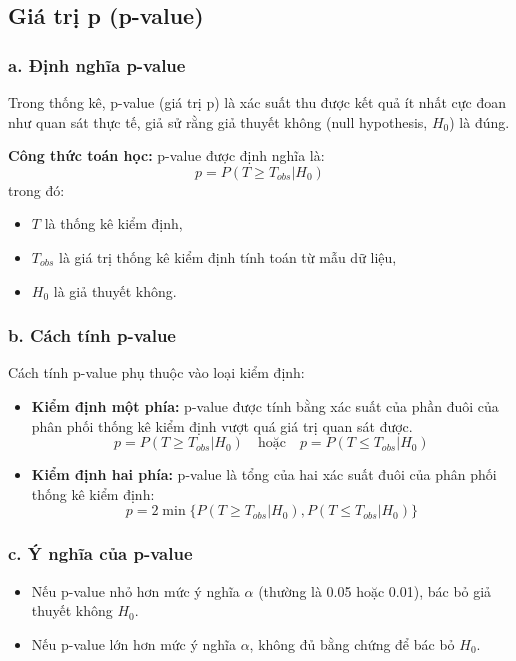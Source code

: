 \subsection{Giá trị p (p-value)}
\subsubsection{a. Định nghĩa p-value}
Trong thống kê, p-value (giá trị p) là xác suất thu được kết quả ít nhất cực đoan như quan sát thực tế, giả sử rằng giả thuyết không (null hypothesis, $H_0$) là đúng.

\textbf{Công thức toán học: }p-value được định nghĩa là:
\begin{equation}
    p = P(T \geq T_{obs} | H_0)
\end{equation}
trong đó:
\begin{itemize}
    \item $T$ là thống kê kiểm định,
    \item $T_{obs}$ là giá trị thống kê kiểm định tính toán từ mẫu dữ liệu,
    \item $H_0$ là giả thuyết không.
\end{itemize}

\subsubsection{b. Cách tính p-value}
Cách tính p-value phụ thuộc vào loại kiểm định:
\begin{itemize}
    \item \textbf{Kiểm định một phía:} p-value được tính bằng xác suất của phần đuôi của phân phối thống kê kiểm định vượt quá giá trị quan sát được.
    \begin{equation}
        p = P(T \geq T_{obs} | H_0) \quad \text{hoặc} \quad p = P(T \leq T_{obs} | H_0)
    \end{equation}
    \item \textbf{Kiểm định hai phía:} p-value là tổng của hai xác suất đuôi của phân phối thống kê kiểm định:
    \begin{equation}
        p = 2 \min\{P(T \geq T_{obs} | H_0), P(T \leq T_{obs} | H_0)\}
    \end{equation}
\end{itemize}

\subsubsection{c. Ý nghĩa của p-value}
\begin{itemize}
    \item Nếu p-value nhỏ hơn mức ý nghĩa $\alpha$ (thường là 0.05 hoặc 0.01), bác bỏ giả thuyết không $H_0$.
    \item Nếu p-value lớn hơn mức ý nghĩa $\alpha$, không đủ bằng chứng để bác bỏ $H_0$.
\end{itemize}

